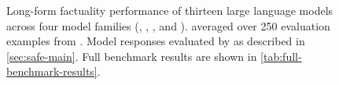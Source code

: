 \begin{figure}[t]
    \caption{
        Long-form factuality performance of thirteen large language models across four model families (\gemini{}, \gpt{}, \claude{}, and \ulm{}).
        \metric{} averaged over 250 evaluation examples from \longfactobjects{}.
        Model responses evaluated by \safe{} as described in \cref{sec:safe-main}.
        Full benchmark results are shown in \cref{tab:full-benchmark-results}.
    }
    \label{fig:rankings-additional-k}
\end{figure}